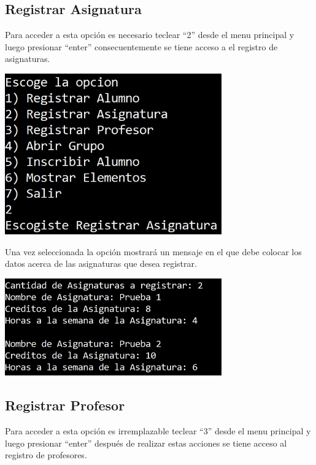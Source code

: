 \documentclass[12pt]{report}
\begin{document}
\subsection*{Registrar Asignatura}
Para acceder a esta opción es necesario teclear ``2'' desde el menu principal y luego presionar ``enter'' consecuentemente se tiene acceso a el registro de asignaturas.

\begin{center}
    \includegraphics[width=0.7\textwidth]{img/Opcion 2 P1.jpg}
\end{center}

\newpage
Una vez seleccionada la opción mostrará un mensaje en el que debe colocar los datos acerca de las asignaturas que desea registrar.

\begin{center}
    \includegraphics[width=0.7\textwidth]{img/Opcion 2 P2.jpg}
\end{center}

\subsection*{Registrar Profesor}
Para acceder a esta opción es irremplazable teclear ``3'' desde el menu principal y luego presionar ``enter'' después de realizar estas acciones se tiene acceso al registro de profesores.
\end{document}
